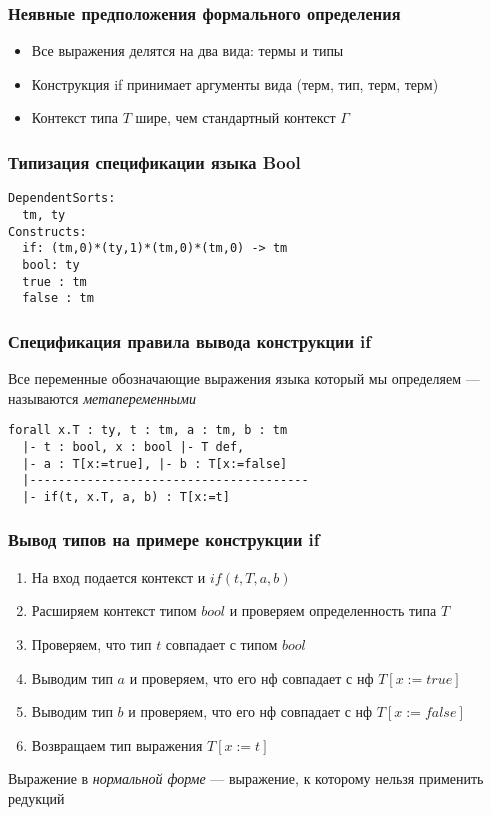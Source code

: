 
\begin{frame}
\frametitle{Неявные предположения формального определения}

\IFF

\begin{itemize}
\item Все выражения делятся на два вида: термы и типы
\item Конструкция if принимает аргументы вида (терм, тип, терм, терм)
\item Контекст типа $T$ шире, чем стандартный контекст $\Gamma$
\end{itemize}

\end{frame}

\begin{frame}[fragile]
\frametitle{Типизация спецификации языка Bool}
\begin{verbatim}
DependentSorts:
  tm, ty
Constructs:
  if: (tm,0)*(ty,1)*(tm,0)*(tm,0) -> tm
  bool: ty
  true : tm
  false : tm
\end{verbatim}
\end{frame}



\begin{frame}[fragile]
\frametitle{Спецификация правила вывода конструкции if}

\IFF


Все переменные обозначающие выражения языка который мы определяем --- называются \textit{метапеременными}

\begin{verbatim}
forall x.T : ty, t : tm, a : tm, b : tm
  |- t : bool, x : bool |- T def,
  |- a : T[x:=true], |- b : T[x:=false]
  |---------------------------------------
  |- if(t, x.T, a, b) : T[x:=t]
\end{verbatim}

\end{frame}
\begin{frame}
\frametitle{Вывод типов на примере конструкции if}

\IFF

\begin{enumerate}
\item На вход подается контекст и $if(t, T, a, b)$
\item Расширяем контекст типом $bool$ и проверяем определенность типа $T$
\item Проверяем, что тип $t$ совпадает с типом $bool$
\item Выводим тип $a$ и проверяем, что его нф совпадает с нф $T[x:=true]$
\item Выводим тип $b$ и проверяем, что его нф совпадает с нф $T[x:=false]$
\item Возвращаем тип выражения $T[x:=t]$
\end{enumerate}
Выражение в \textit{нормальной форме} --- выражение, к которому нельзя применить редукций
\end{frame}

